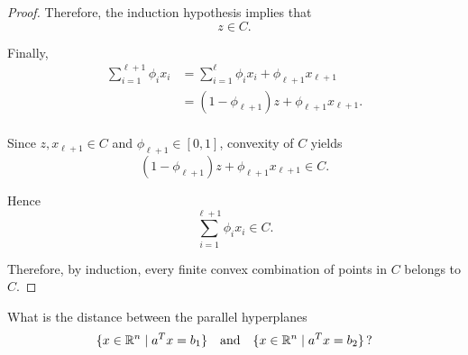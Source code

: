 \documentclass[12pt]{book}
\begin{document}
\begin{proof}
    Therefore, the induction hypothesis implies that
    \begin{equation*}
        z \in C.
    \end{equation*}

    Finally,
    \begin{equation*}
    \begin{aligned}
        \sum_{i=1}^{\ell+1}\phi_i x_i
        &=
        \sum_{i=1}^{\ell}\phi_i x_i
        + \phi_{\ell+1}x_{\ell+1} \\
        &=
        (1-\phi_{\ell+1})z
        + \phi_{\ell+1}x_{\ell+1}.
    \end{aligned}
    \end{equation*} \\

    Since $z,x_{\ell+1}\in C$ and
    $\phi_{\ell+1}\in[0,1]$, convexity of $C$ yields
    \begin{equation*}
        (1-\phi_{\ell+1})z
        + \phi_{\ell+1}x_{\ell+1}
        \in C.
    \end{equation*}

    Hence
    \begin{equation*}
        \sum_{i=1}^{\ell+1}\phi_i x_i
        \in C.
    \end{equation*}

    Therefore, by induction, every finite convex combination of points in $C$
    belongs to $C$.
\end{proof}


\newpage


\begin{exercise}
    What is the distance between the parallel hyperplanes
    \begin{align*}
        \{x \in \mathbb{R}^n \mid a^T x = b_1\}
        \quad \text{and} \quad
        \{x \in \mathbb{R}^n \mid a^T x = b_2\}\, ?
    \end{align*}
\end{exercise}
\end{document}
